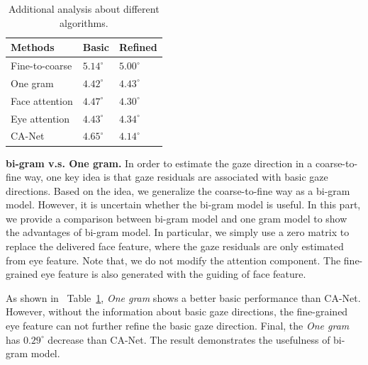 \documentclass[letterpaper]{article}
\def\bm #1{\boldsymbol{#1}}%
\newcommand{\Tref}[1]{Table~\ref{#1}}
\begin{document}
\begin{table}[t]
	\renewcommand\arraystretch{1.3}
	\normalsize
	\caption{Additional analysis about different algorithms.}
	\begin{center}

		\begin{adjustbox}{width=0.78\columnwidth}
\begin{tabular}{|p{3.0cm}<{\centering}|p{1.9cm}<{\centering}|p{1.9cm}<{\centering}|}
			\hline

			Methods& Basic& 	Refined \\
			\hline
			Fine-to-coarse			&$5.14^{\circ}$		&$5.00^{\circ}$		\\

			One gram				&$4.42^{\circ}$ 	&$4.43^{\circ}$	 \\

			Face attention				&$4.47^{\circ}$		&$4.30^{\circ}$				\\

			Eye attention				&$4.43^{\circ}$		&$4.34^{\circ}$			\\
			\hline
			CA-Net					&$\bm{4.65^{\circ}}$		&$\bm{4.14^{\circ}}$			\\
			\hline
		\end{tabular}
\end{adjustbox}
		\label{table:attention}
	\end{center}
\end{table}
\textbf{bi-gram v.s. One gram.}
In order to estimate the gaze direction in a coarse-to-fine way, one key idea is that gaze residuals are associated with basic gaze directions.
Based on the idea, we generalize the coarse-to-fine way as a bi-gram model.
However, it is uncertain whether the bi-gram model is useful.
In this part, we provide a comparison between bi-gram model and one gram model to show the advantages of bi-gram model.
In particular, we simply use a zero matrix to replace the delivered face feature, where the gaze residuals are only estimated from eye feature.
Note that, we do not modify the attention component. The fine-grained eye feature is also generated with the guiding of face feature.

As shown in ~\Tref{table:attention}, \emph{One gram} shows a better basic performance than CA-Net.
However, without the information about basic gaze directions, the fine-grained eye feature can not further refine the basic gaze direction.
Final, the \emph{One gram} has $0.29^{\circ}$ decrease than CA-Net.
The result demonstrates the usefulness of bi-gram model.
\end{document}
